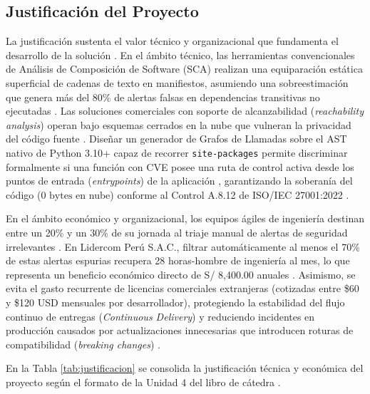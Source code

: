 \subsection{Justificación del Proyecto}
La justificación sustenta el valor técnico y organizacional que fundamenta el desarrollo de la solución \parencite{sommerville2016software, pressman2020software}. En el ámbito técnico, las herramientas convencionales de Análisis de Composición de Software (SCA) realizan una equiparación estática superficial de cadenas de texto en manifiestos, asumiendo una sobreestimación que genera más del 80\% de alertas falsas en dependencias transitivas no ejecutadas \parencite{pashchenko2022vuln4real, dann2021identifying}. %
Las soluciones comerciales con soporte de alcanzabilidad (\textit{reachability analysis}) operan bajo esquemas cerrados en la nube que vulneran la privacidad del código fuente \parencite{endorlabs2023state, ladisa2023sok}. %
Diseñar un generador de Grafos de Llamadas sobre el AST nativo de Python 3.10+ capaz de recorrer \texttt{site-packages} permite discriminar formalmente si una función con CVE posee una ruta de control activa desde los puntos de entrada (\textit{entrypoints}) de la aplicación \parencite{salis2021pycg, ryder1979constructing}, garantizando la soberanía del código ($0\text{ bytes}$ en nube) conforme al Control A.8.12 de ISO/IEC 27001:2022 \parencite{gutierrez2024auditoria}. %

En el ámbito económico y organizacional, los equipos ágiles de ingeniería destinan entre un 20\% y un 30\% de su jornada al triaje manual de alertas de seguridad irrelevantes \parencite{johnson2013developers, sadowski2018lessons}. %
En Lidercom Perú S.A.C., filtrar automáticamente al menos el 70\% de estas alertas espurias recupera 28 horas-hombre de ingeniería al mes, lo que representa un beneficio económico directo de S/ 8,400.00 anuales \parencite{torres2026proyecto}. %
Asimismo, se evita el gasto recurrente de licencias comerciales extranjeras (cotizadas entre \$60 y \$120 USD mensuales por desarrollador), protegiendo la estabilidad del flujo continuo de entregas (\textit{Continuous Delivery}) y reduciendo incidentes en producción causados por actualizaciones innecesarias que introducen roturas de compatibilidad (\textit{breaking changes}) \parencite{bogart2016break, humble2010continuous}. %

En la Tabla \ref{tab:justificacion} se consolida la justificación técnica y económica del proyecto según el formato de la Unidad 4 del libro de cátedra \parencite{torres2026proyecto}. %

